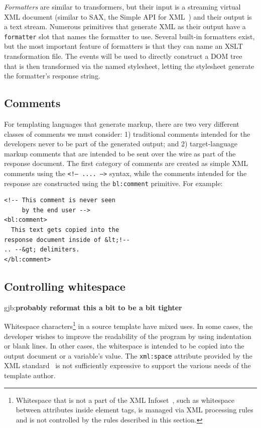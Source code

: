 \documentclass{www2003-submission}
\newcommand{\smtexttt}[1]{{\small\texttt{#1}}}
\newcommand{\gjb}[1]{{\sc gjb:}\textbf{#1}}
\begin{document}
\emph{Formatters} are similar to transformers, but their input is a streaming
virtual XML document (similar to SAX, the Simple API for XML~\cite{SAX})
and their output is a text stream.  Numerous primitives that generate
XML as their output have a \smtexttt{formatter} slot that names the
formatter to use. Several built-in formatters exist, but the most
important feature of formatters is that they can name an XSLT
transformation file.   The events will be used to directly construct a
DOM tree that is then transformed via the named stylesheet, letting the
stylesheet generate the formatter's response string.

\subsection{Comments}

For templating languages that generate markup, there are two very
different classes of comments we must consider: 1) traditional
comments intended for the developers never to be part of the generated
output; and 2) target-language markup comments that are intended to be
sent over the wire as part of the response document.  The first
category of comments are created as simple XML comments using the
\smtexttt{<!-- .... -->} syntax, while the comments intended for the
response are constructed using the \smtexttt{bl:comment} primitive.
For example:

\begin{verbatim}
<!-- This comment is never seen
     by the end user -->
<bl:comment>
  This text gets copied into the
response document inside of &lt;!--
.. --&gt; delimiters.
</bl:comment>
\end{verbatim}


\subsection{Controlling whitespace}

\gjb{probably reformat this a bit to be a bit tighter}

Whitespace characters\footnote{Whitespace that is not a part of the
XML Infoset~\cite{XML-infoset}, such as whitespace between attributes inside element
tags, is managed via XML processing rules and is not controlled by the
rules described in this section.} in a source template have mixed uses.  In some
cases, the developer wishes to improve the readability of the program
by using indentation or blank lines.  In other cases, the whitespace
is intended to be copied into the output document or a variable's
value.  The \smtexttt{xml:space} attribute provided by the XML
standard~\cite[2.10]{XML} is not sufficiently expressive to support
the various needs of the template author.
\end{document}
